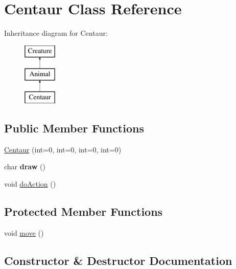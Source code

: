 \hypertarget{class_centaur}{}\section{Centaur Class Reference}
\label{class_centaur}
Inheritance diagram for Centaur\+:\begin{figure}[H]
\begin{center}
\leavevmode
\includegraphics[height=3.000000cm]{class_centaur}
\end{center}
\end{figure}
\subsection*{Public Member Functions}
\begin{DoxyCompactItemize}
\item 
\hyperlink{class_centaur_afc70d85a296f8bb7006525675ee4d92a}{Centaur} (int=0, int=0, int=0, int=0)
\item 
char {\bfseries draw} ()\hypertarget{class_centaur_a377c0ba95b6599ce868049f551b37b6e}{}\label{class_centaur_a377c0ba95b6599ce868049f551b37b6e}

\item 
void \hyperlink{class_centaur_a548d9ff34d62d1ba596a6dbdd3199216}{do\+Action} ()
\end{DoxyCompactItemize}
\subsection*{Protected Member Functions}
\begin{DoxyCompactItemize}
\item 
void \hyperlink{class_centaur_a3e69089861f1d984eb7528952c3c1d04}{move} ()
\end{DoxyCompactItemize}


\subsection{Constructor \& Destructor Documentation}
